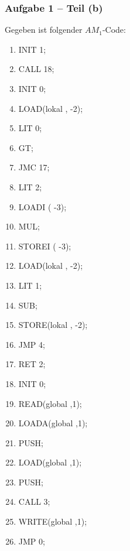 \documentclass[aspectratio=1610,onlymath, ngerman]{beamer}
\begin{document}
	\begin{frame} \frametitle{Aufgabe 1 -- Teil (b)}
	\small
	
		Gegeben ist folgender $AM_1$-Code: \\
		\bigskip 
		
		\begin{minipage}{\dimexpr0.33\linewidth-\fboxrule-\fboxsep}
			\begin{ttfamily}
				\begin{enumerate}[label=\arabic*:, nolistsep]
					\item INIT 1;
					\item CALL 18;
					\item INIT 0;
					\item LOAD(lokal , -2);
					\item LIT 0;
					\item GT;
					\item JMC 17;
					\item LIT 2;
					\item LOADI ( -3);
				\end{enumerate}
			\end{ttfamily}
		\end{minipage}
		\begin{minipage}{\dimexpr0.33\linewidth-\fboxrule-\fboxsep}
			\begin{ttfamily}
				\begin{enumerate}[label=\arabic*:, nolistsep]
					\setcounter{enumi}{9}
					\item MUL;
					\item STOREI ( -3);
					\item LOAD(lokal , -2);
					\item LIT 1;
					\item SUB;
					\item STORE(lokal , -2);
					\item JMP 4;
					\item RET 2;
					\item INIT 0;
				\end{enumerate}
			\end{ttfamily}
		\end{minipage}
		\begin{minipage}{\dimexpr0.33\linewidth-\fboxrule-\fboxsep}
			\begin{ttfamily}
				\begin{enumerate}[label=\arabic*:, nolistsep]
					\setcounter{enumi}{18}
					\item READ(global ,1);
					\item LOADA(global ,1);
					\item PUSH;
					\item LOAD(global ,1);
					\item PUSH;
					\item CALL 3;
					\item WRITE(global ,1);
					\item JMP 0;


\end{enumerate}
\end{ttfamily}
\end{minipage}
\end{frame}
\end{document}
